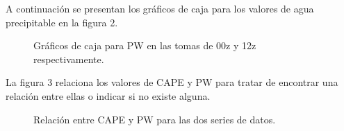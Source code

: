 \documentclass{article} %
\begin{document}
A continuación se presentan los gráficos de caja para los valores de agua precipitable en la figura 2. 

\begin{center}%

\begin{figure}%
    \centering
    \qquad
    \caption{Gráficos de caja para PW en las tomas de 00z y 12z respectivamente.}%
\end{figure}
	
\end{center}%

La figura 3 relaciona los valores de CAPE y PW para tratar de encontrar una relación entre ellas o indicar si no existe alguna. 

\begin{center}%

\begin{figure}%
    \centering
    \qquad
    \caption{Relación entre CAPE y PW para las dos series de datos.}%
\end{figure}
	
\end{center}%
\end{document}
